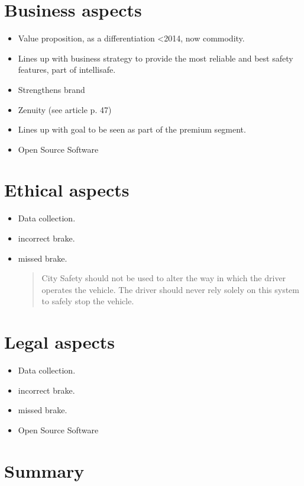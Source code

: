 \documentclass[conference]{IEEEtran}
\begin{document}
\section{Business aspects}
\begin{itemize}
	\item Value proposition, as a differentiation <2014, now commodity.
	\item Lines up with business strategy to provide the most reliable and best safety features, part of intellisafe.
	\item Strengthens brand
	\item Zenuity (see article p. 47)
	\item Lines up with goal to be seen as part of the premium segment.
	\item Open Source Software
\end{itemize}
\section{Ethical aspects}
\begin{itemize}
	\item Data collection.
	\item incorrect brake.
	\item missed brake.
	\begin{quotation}
		City Safety should not be used to alter the way in which the driver operates the vehicle. The driver should never rely solely on this system to safely stop the vehicle.
	\end{quotation}
\end{itemize}

\section{Legal aspects}
\begin{itemize}
	\item Data collection.
	\item incorrect brake.
	\item missed brake.
	\item Open Source Software
\end{itemize}

\section{Summary}
\end{document}
